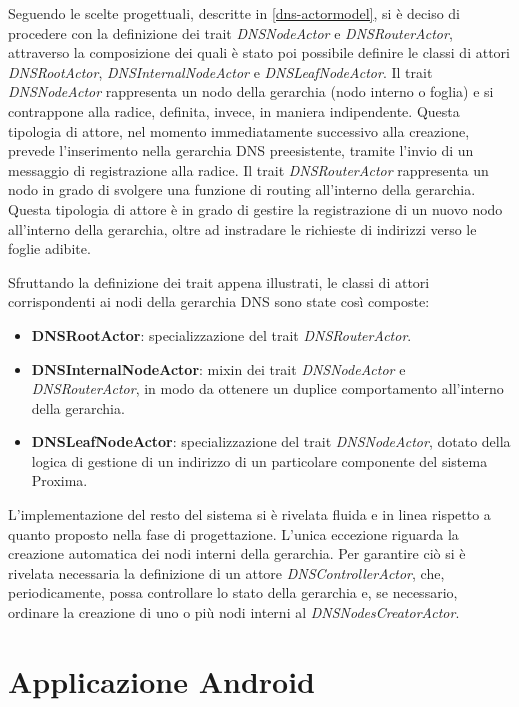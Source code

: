\documentclass[a4paper,12pt]{report}
\begin{document}
Seguendo le scelte progettuali, descritte in \autoref{dns-actormodel}, si è deciso di procedere con la definizione dei trait \emph{DNSNodeActor} e \emph{DNSRouterActor}, attraverso la composizione dei quali è stato poi possibile definire le classi di attori \emph{DNSRootActor}, \emph{DNSInternalNodeActor} e \emph{DNSLeafNodeActor}. Il trait \emph{DNSNodeActor} rappresenta un nodo della gerarchia (nodo interno o foglia) e si contrappone alla radice, definita, invece, in maniera indipendente. Questa tipologia di attore, nel momento immediatamente successivo alla creazione, prevede l'inserimento nella gerarchia DNS preesistente, tramite l'invio di un messaggio di registrazione alla radice. Il trait \emph{DNSRouterActor} rappresenta un nodo in grado di svolgere una funzione di routing all'interno della gerarchia. Questa tipologia di attore è in grado di gestire la registrazione di un nuovo nodo all'interno della gerarchia, oltre ad instradare le richieste di indirizzi verso le foglie adibite.

Sfruttando la definizione dei trait appena illustrati, le classi di attori corrispondenti ai nodi della gerarchia DNS sono state così composte:
\begin{itemize}
	\item \textbf{DNSRootActor}: specializzazione del trait \emph{DNSRouterActor}.
	\item \textbf{DNSInternalNodeActor}: mixin dei trait \emph{DNSNodeActor} e \emph{DNSRouterActor}, in modo da ottenere un duplice comportamento all'interno della gerarchia.
	\item \textbf{DNSLeafNodeActor}: specializzazione del trait \emph{DNSNodeActor}, dotato della logica di gestione di un indirizzo di un particolare componente del sistema Proxima.
\end{itemize}

L'implementazione del resto del sistema si è rivelata fluida e in linea rispetto a quanto proposto nella fase di progettazione. L'unica eccezione riguarda la creazione automatica dei nodi interni della gerarchia. Per garantire ciò si è rivelata necessaria la definizione di un attore \emph{DNSControllerActor}, che, periodicamente, possa controllare lo stato della gerarchia e, se necessario, ordinare la creazione di uno o più nodi interni al \emph{DNSNodesCreatorActor}.

\section{Applicazione Android}
\end{document}
